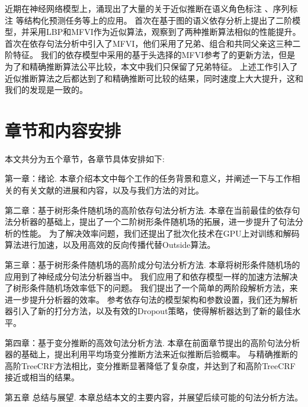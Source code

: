 近期在神经网络模型上，涌现出了大量的关于近似推断在语义角色标注 \citep{li-etal-2020-high}、序列标注 \citep{wang-etal-2020-ain}等结构化预测任务等上的应用。
\citet{wang-etal-2019-second}首次在基于图的语义依存分析上提出了二阶模型，并采用LBP和MFVI作为近似算法，观察到了两种推断算法相似的性能提升。
\citet{wang-tu-2020-second}首次在依存句法分析中引入了MFVI，他们采用了兄弟、组合和共同父亲这三种二阶特征。
我们的依存模型中采用的基于头选择的MFVI参考了\citet{wang-tu-2020-second}的更新方法，但是为了和精确推断算法公平比较，本文中我们只保留了兄弟特征。
上述工作引入了近似推断算法之后都达到了和精确推断可比较的结果，同时速度上大大提升，这和我们的发现是一致的。

\section{章节和内容安排}

本文共分为五个章节，各章节具体安排如下:

第一章：绪论.
本章介绍本文中每个工作的任务背景和意义，并阐述一下与工作相关的有关文献的进展和内容，以及与我们方法的对比。

第二章：基于树形条件随机场的高阶依存句法分析方法.
本章在当前最佳的依存句法分析器的基础上，提出了一个二阶树形条件随机场的拓展，进一步提升了句法分析的性能。
为了解决效率问题，我们还提出了批次化技术在GPU上对训练和解码算法进行加速，以及用高效的反向传播代替Outside算法。

第三章：基于树形条件随机场的高阶成分句法分析方法.
本章将树形条件随机场的应用到了神经成分句法分析器当中。
我们应用了和依存模型一样的加速方法解决了树形条件随机场效率低下的问题。
我们提出了一个简单的两阶段解析方法，来进一步提升分析器的效率。
参考依存句法的模型架构和参数设置，我们还为解析器引入了新的打分方法，以及有效的Dropout策略，使得解析器达到了新的最佳水平。

第四章：基于变分推断的高效句法分析方法.
本章在前面章节提出的高阶句法分析器的基础上，提出利用平均场变分推断方法来近似推断后验概率。
与精确推断的高阶TreeCRF方法相比，变分推断显著降低了复杂度，并达到了和高阶TreeCRF接近或相当的结果。

第五章 总结与展望.
本章总结本文的主要内容，并展望后续可能的句法分析方法。
